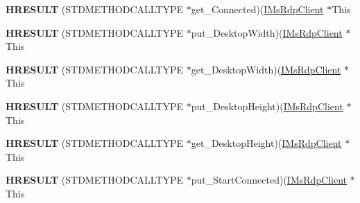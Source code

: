 \begin{DoxyCompactItemize}
\item 
\mbox{\label{struct_m_s_t_s_c_lib_1_1_i_ms_rdp_client_vtbl_ad7277e8c873143be3a629dcec28f479e}} 
{\bfseries H\+R\+E\+S\+U\+LT} (S\+T\+D\+M\+E\+T\+H\+O\+D\+C\+A\+L\+L\+T\+Y\+PE $\ast$get\+\_\+\+Connected)(\hyperlink{interface_m_s_t_s_c_lib_1_1_i_ms_rdp_client}{I\+Ms\+Rdp\+Client} $\ast$This
\item 
\mbox{\label{struct_m_s_t_s_c_lib_1_1_i_ms_rdp_client_vtbl_abb8c33e7e5a06717cf23d5aef8544d2f}} 
{\bfseries H\+R\+E\+S\+U\+LT} (S\+T\+D\+M\+E\+T\+H\+O\+D\+C\+A\+L\+L\+T\+Y\+PE $\ast$put\+\_\+\+Desktop\+Width)(\hyperlink{interface_m_s_t_s_c_lib_1_1_i_ms_rdp_client}{I\+Ms\+Rdp\+Client} $\ast$This
\item 
\mbox{\label{struct_m_s_t_s_c_lib_1_1_i_ms_rdp_client_vtbl_ad71031f89b9402670e65c9604b0515c3}} 
{\bfseries H\+R\+E\+S\+U\+LT} (S\+T\+D\+M\+E\+T\+H\+O\+D\+C\+A\+L\+L\+T\+Y\+PE $\ast$get\+\_\+\+Desktop\+Width)(\hyperlink{interface_m_s_t_s_c_lib_1_1_i_ms_rdp_client}{I\+Ms\+Rdp\+Client} $\ast$This
\item 
\mbox{\label{struct_m_s_t_s_c_lib_1_1_i_ms_rdp_client_vtbl_ac24c967052984ba58f1a23e4004f66b5}} 
{\bfseries H\+R\+E\+S\+U\+LT} (S\+T\+D\+M\+E\+T\+H\+O\+D\+C\+A\+L\+L\+T\+Y\+PE $\ast$put\+\_\+\+Desktop\+Height)(\hyperlink{interface_m_s_t_s_c_lib_1_1_i_ms_rdp_client}{I\+Ms\+Rdp\+Client} $\ast$This
\item 
\mbox{\label{struct_m_s_t_s_c_lib_1_1_i_ms_rdp_client_vtbl_adb69e7925e239f6775c61c565c9dd48f}} 
{\bfseries H\+R\+E\+S\+U\+LT} (S\+T\+D\+M\+E\+T\+H\+O\+D\+C\+A\+L\+L\+T\+Y\+PE $\ast$get\+\_\+\+Desktop\+Height)(\hyperlink{interface_m_s_t_s_c_lib_1_1_i_ms_rdp_client}{I\+Ms\+Rdp\+Client} $\ast$This
\item 
\mbox{\label{struct_m_s_t_s_c_lib_1_1_i_ms_rdp_client_vtbl_a231f4c61507c99c9927d6a2e7d77cf93}} 
{\bfseries H\+R\+E\+S\+U\+LT} (S\+T\+D\+M\+E\+T\+H\+O\+D\+C\+A\+L\+L\+T\+Y\+PE $\ast$put\+\_\+\+Start\+Connected)(\hyperlink{interface_m_s_t_s_c_lib_1_1_i_ms_rdp_client}{I\+Ms\+Rdp\+Client} $\ast$This

\end{DoxyCompactItemize}
